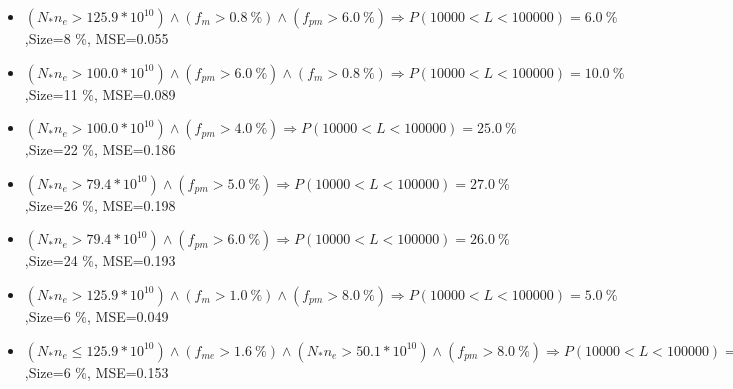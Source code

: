 \documentclass[numbered]{CSL}
\begin{document}
\begin{itemize}
\item $(N_* n_e > 125.9 * 10^{10}) \land (f_m > 0.8~\%) \land (f_{pm} > 6.0~\%) \Rightarrow P(10 000 < L < 100 000) = 6.0~\%$,\hfill Size=8 \%, MSE=0.055
\item $(N_* n_e > 100.0 * 10^{10}) \land (f_{pm} > 6.0~\%) \land (f_m > 0.8~\%) \Rightarrow P(10 000 < L < 100 000) = 10.0~\%$,\hfill Size=11 \%, MSE=0.089
\item $(N_* n_e > 100.0 * 10^{10}) \land (f_{pm} > 4.0~\%) \Rightarrow P(10 000 < L < 100 000) = 25.0~\%$,\hfill Size=22 \%, MSE=0.186
\item $(N_* n_e > 79.4 * 10^{10}) \land (f_{pm} > 5.0~\%) \Rightarrow P(10 000 < L < 100 000) = 27.0~\%$,\hfill Size=26 \%, MSE=0.198
\item $(N_* n_e > 79.4 * 10^{10}) \land (f_{pm} > 6.0~\%) \Rightarrow P(10 000 < L < 100 000) = 26.0~\%$,\hfill Size=24 \%, MSE=0.193
\item $(N_* n_e > 125.9 * 10^{10}) \land (f_m > 1.0~\%) \land (f_{pm} > 8.0~\%) \Rightarrow P(10 000 < L < 100 000) = 5.0~\%$,\hfill Size=6 \%, MSE=0.049
\item $(N_* n_e \leq 125.9 * 10^{10}) \land (f_{me} > 1.6~\%) \land (N_* n_e > 50.1 * 10^{10}) \land (f_{pm} > 8.0~\%) \Rightarrow P(10 000 < L < 100 000) = 19.0~\%$,\hfill Size=6 \%, MSE=0.153
\end{itemize}
\end{document}
